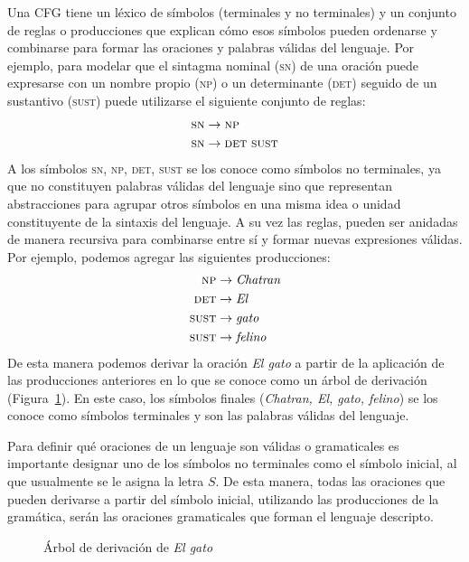 Una CFG tiene un léxico de símbolos (terminales y no terminales) y un conjunto de reglas o producciones que explican cómo esos símbolos pueden ordenarse y combinarse para formar las oraciones y palabras válidas del lenguaje. Por ejemplo, para modelar que el sintagma nominal (\textsc{sn}) de una oración puede expresarse con un nombre propio (\textsc{np}) o un determinante (\textsc{det}) seguido de un sustantivo (\textsc{sust}) puede utilizarse el siguiente conjunto de reglas:
%
\begin{align*}
    \textsc{sn} &\to \textsc{np}\\
    \textsc{sn} &\to \textsc{det}\ \textsc{sust}
\end{align*}
%
A los símbolos \textsc{sn}, \textsc{np}, \textsc{det}, \textsc{sust} se los conoce como símbolos no terminales, ya que no constituyen palabras válidas del lenguaje sino que representan abstracciones para agrupar otros símbolos en una misma idea o unidad constituyente de la sintaxis del lenguaje. A su vez las reglas, pueden ser anidadas de manera recursiva para combinarse entre sí y formar nuevas expresiones válidas. Por ejemplo, podemos agregar las siguientes producciones:
%
\begin{align*}
    \textsc{np}   &\to \textit{Chatran}\\
    \textsc{det}  &\to \textit{El}\\
    \textsc{sust} &\to \textit{gato}\\
    \textsc{sust} &\to \textit{felino}
\end{align*}
%
De esta manera podemos derivar la oración \textit{El gato} a partir de la aplicación de las producciones anteriores en lo que se conoce como un árbol de derivación (Figura~\ref{intro:arbol}). En este caso, los símbolos finales (\textit{Chatran, El, gato, felino}) se los conoce como símbolos terminales y son las palabras válidas del lenguaje. 

Para definir qué oraciones de un lenguaje son válidas o gramaticales  es importante designar uno de los símbolos no terminales como el símbolo inicial, al que usualmente se le asigna la letra $S$. De esta manera, todas las oraciones que pueden derivarse a partir del símbolo inicial, utilizando las producciones de la gramática, serán las oraciones gramaticales que forman el lenguaje descripto. 

\begin{figure}[h!]
    \centering
    \caption{Árbol de derivación de \textit{El gato}}
    \label{intro:arbol}
\end{figure}

